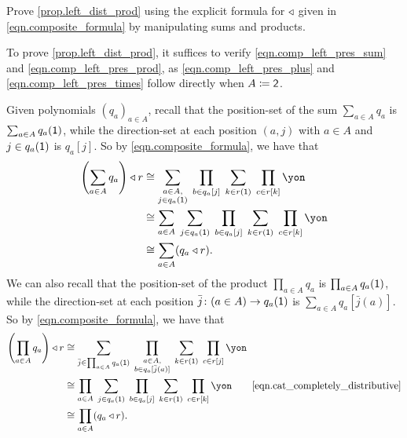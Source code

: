 \documentclass[Book-Poly]{subfiles}
\begin{document}
\begin{exercise}\label{exc.left_dist}
Prove \cref{prop.left_dist_prod} using the explicit formula for $\mathbin{\triangleleft}$ given in \eqref{eqn.composite_formula} by manipulating sums and products.
\begin{solution}
To prove \cref{prop.left_dist_prod}, it suffices to verify \eqref{eqn.comp_left_pres_sum} and \eqref{eqn.comp_left_pres_prod}, as \eqref{eqn.comp_left_pres_plus} and \eqref{eqn.comp_left_pres_times} follow directly when $A\coloneqq\textsf{2}$.

Given polynomials $(q_a)_{a\in A}$, recall that the position-set of the sum $\sum_{a\in A}q_a$ is $\sum_{a\in A}q_a(\textsf{1})$, while the direction-set at each position $(a,j)$ with $a\in A$ and $j\in q_a(\textsf{1})$ is $q_a[j]$.
So by \eqref{eqn.composite_formula}, we have that
\begin{align*}
    \left(\sum_{a\in A}q_a\right)\tri r &\iso \sum_{\substack{a\in A, \\ j\in q_a(\1)}}\;\prod_{b \in q_a[j]}\;\sum_{k \in r(\1)}\;\prod_{c \in r[k]}\yon \\
    &\iso \sum_{a\in A}\;\sum_{j\in q_a(\1)}\;\prod_{b \in q_a[j]}\;\sum_{k \in r(\1)}\;\prod_{c \in r[k]}\yon \\
    &\iso\sum_{a\in A}(q_a\tri r).
\end{align*}
We can also recall that the position-set of the product $\prod_{a\in A}q_a$ is $\prod_{a\in A}q_a(\textsf{1})$, while the direction-set at each position $\bar{j}\colon(a\in A)\to q_a(\textsf{1})$ is $\sum_{a\in A}q_a[\bar{j}(a)]$.
So by \eqref{eqn.composite_formula}, we have that
\begin{align*}
    \left(\prod_{a\in A}q_a\right)\tri r &\iso \sum_{\bar{j}\in\prod_{a\in A}q_a(\1)} \; \prod_{\substack{a\in A, \\ b\in q_a[\bar{j}(a)]}} \; \sum_{k \in r(\1)} \; \prod_{c \in r[j]} \yon \\
    &\iso \prod_{a\in A} \; \sum_{j\in q_a(\1)} \; \prod_{b\in q_a[j]} \; \sum_{k \in r(\1)} \; \prod_{c \in r[k]} \yon \tag*{\eqref{eqn.cat_completely_distributive}} \\
    &\iso\prod_{a\in A}(q_a\tri r).
\end{align*}
\end{solution}
\end{exercise}
\end{document}
